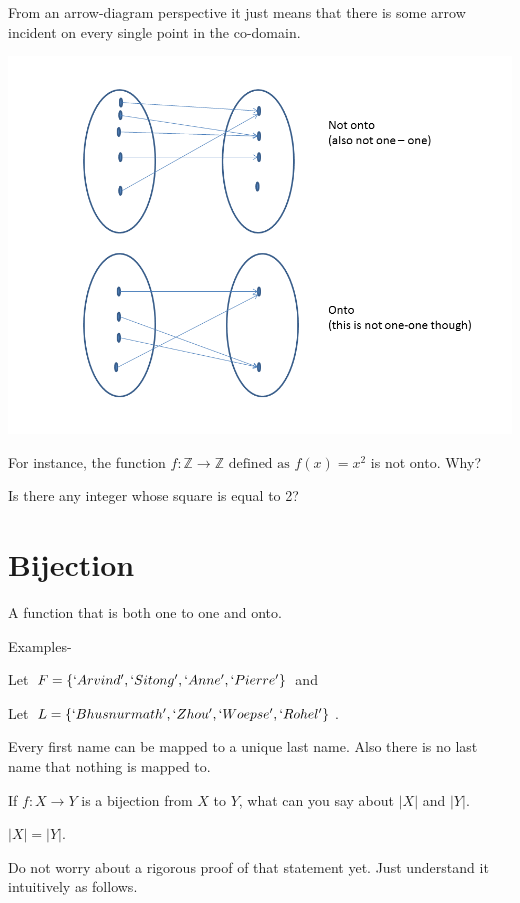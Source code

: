 \documentclass[12pt]{article}
\begin{document}
From an arrow-diagram perspective it just means that there is some arrow incident on every single point in the co-domain.

\includegraphics[scale=0.7]{Onto.png}

\vspace{0.5in}

For instance, the function $f: \mathbb{Z} \rightarrow \mathbb{Z} \text{ defined as } f(x) = x^2$ is not onto.
Why?

Is there any integer whose square is equal to 2? 


\section*{Bijection}

A function that is both one to one and onto. 

Examples- 

Let $F = \{`Arvind', `Sitong', `Anne', `Pierre'\}$ and 

Let $L = \{`Bhusnurmath', `Zhou', `Woepse', `Rohel'\}$.

Every first name can be mapped to a unique last name. Also there is no last name that nothing is mapped to.

\medskip

If $f: X \rightarrow Y$ is a bijection from $X$ to $Y$, what can you say about $|X|$ and $|Y|$.

$|X| = |Y|$.


Do not worry about a rigorous proof of that statement yet. Just understand it intuitively as follows. 
\end{document}
